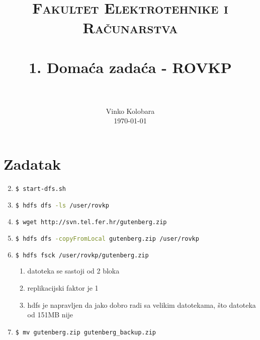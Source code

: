 \documentclass[paper=a4, fontsize=11pt]{scrartcl}
\title{
		\usefont{OT1}{bch}{b}{n}
		\normalfont \normalsize \textsc{Fakultet Elektrotehnike i Računarstva} \\ [25pt]
		\horrule{0.5pt} \\[0.4cm]
		\huge 1. Domaća zadaća - ROVKP \\
		\horrule{2pt} \\[0.5cm]
}
\author{
		\normalfont 								\normalsize
        Vinko Kolobara\\[-3pt]		\normalsize
        \today
}
\date{}
\numberwithin{equation}{section}		%
\numberwithin{figure}{section}			%
\numberwithin{table}{section}				%
\begin{document}
\maketitle

\section{Zadatak}

\begin{enumerate}
\setcounter{enumi}{1}


\item{
\begin{lstlisting}[language=bash]
  $ start-dfs.sh
\end{lstlisting}
}

\item{
\begin{lstlisting}[language=bash]
  $ hdfs dfs -ls /user/rovkp
\end{lstlisting}
}

\item{
\begin{lstlisting}[language=bash]
  $ wget http://svn.tel.fer.hr/gutenberg.zip
\end{lstlisting}
}

\item{
\begin{lstlisting}[language=bash]
  $ hdfs dfs -copyFromLocal gutenberg.zip /user/rovkp
\end{lstlisting}
}

\item{
\begin{lstlisting}[language=bash]
  $ hdfs fsck /user/rovkp/gutenberg.zip
\end{lstlisting}

\begin{enumerate}[label=\alph*.]

\item {
datoteka se sastoji od 2 bloka
}

\item {
replikacijski faktor je 1
}

\item {
hdfs je napravljen da jako dobro radi sa velikim datotekama, što datoteka od 151MB nije
}

\end{enumerate}
}

\item{
\begin{lstlisting}[language=bash]
  $ mv gutenberg.zip gutenberg_backup.zip
\end{lstlisting}
}


\end{enumerate}
\end{document}
